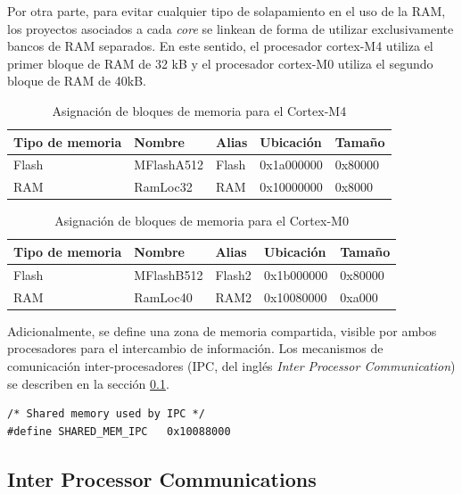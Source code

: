 Por otra parte, para evitar cualquier tipo de solapamiento en el uso de la RAM, los proyectos asociados a cada \textit{core} se linkean de forma de utilizar exclusivamente bancos de RAM separados.  En este sentido, el procesador cortex-M4 utiliza el primer bloque de RAM de 32 kB y el procesador cortex-M0 utiliza el segundo bloque de RAM de 40kB.

\begin{table}[ht]
\centering
\caption{Asignación de bloques de memoria para el Cortex-M4}
\begin{tabular}{lllll}
\toprule
\textbf{Tipo de memoria} & \textbf{Nombre} & \textbf{Alias} & \textbf{Ubicación} & \textbf{Tamaño} \\ 
\midrule
Flash                    & MFlashA512      & Flash          & 0x1a000000         & 0x80000         \\
RAM                      & RamLoc32        & RAM            & 0x10000000         & 0x8000          \\ 
\bottomrule
\end{tabular}
\label{tab:memoriaM4}
\end{table}

\begin{table}[ht]
\centering
\caption{Asignación de bloques de memoria para el Cortex-M0}
\begin{tabular}{lllll}
\toprule
\textbf{Tipo de memoria} & \textbf{Nombre} & \textbf{Alias} & \textbf{Ubicación} & \textbf{Tamaño} \\ 
\midrule
Flash                    & MFlashB512      & Flash2          & 0x1b000000         & 0x80000         \\
RAM                      & RamLoc40        & RAM2            & 0x10080000         & 0xa000          \\ 
\bottomrule
\end{tabular}
\label{tab:memoriaM0}
\end{table}

Adicionalmente, se define una zona de memoria compartida, visible por ambos procesadores para el intercambio de información. Los mecanismos de comunicación inter-procesadores (IPC, del inglés \textit{Inter Processor Communication}) se describen en la sección \ref{subsec:IPC}. 

\begin{verbatim}
/* Shared memory used by IPC */
#define SHARED_MEM_IPC   0x10088000	 
\end{verbatim}

\subsection{Inter Processor Communications}
\label{subsec:IPC}

